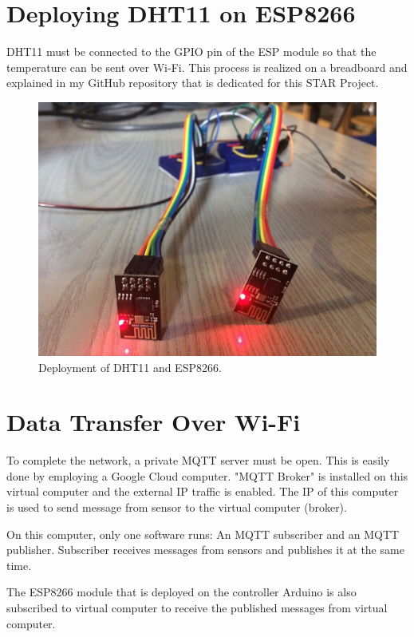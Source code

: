 \documentclass[a4paper,12pt]{article}
\begin{document}
\section{Deploying DHT11 on ESP8266}
DHT11 must be connected to the GPIO pin of the ESP module so that the temperature can be sent over Wi-Fi. This process is realized on a breadboard and explained in my GitHub repository \cite{ref-starGithub} that is dedicated for this STAR Project.
\begin{figure}[h]
	\center
	\setlength{\unitlength}{\textwidth} 
	\includegraphics[width=0.4\unitlength]{images/esp-modules}
	\caption{\label{fig:esp-modules}Deployment of DHT11 and ESP8266.}
\end{figure}
\section{Data Transfer Over Wi-Fi}
To complete the network, a private MQTT server must be open. This is easily done by employing a Google Cloud computer. "MQTT Broker" is installed on this virtual computer and the external IP traffic is enabled. The IP of this computer is used to send message from sensor to the virtual computer (broker).

On this computer, only one software runs: An MQTT subscriber and an MQTT publisher. Subscriber receives messages from sensors and publishes it at the same time.

The ESP8266 module that is deployed on the controller Arduino is also subscribed to virtual computer to receive the published messages from virtual computer.
\end{document}
